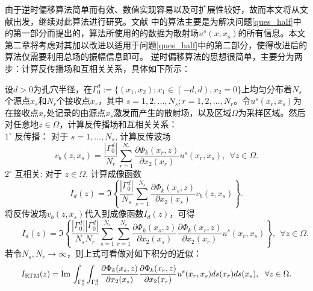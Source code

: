 由于逆时偏移算法简单而有效、数值实现容易以及可扩展性较好，故而本文将从文献\cite{ch_ha}出发，继续对此算法进行研究。文献
\cite{ch_ha}中的算法主要是为解决问题\ref{ques_half}中的第一部分而提出的，算法所使用的的数据为散射场$u^s(x,x_s)$的所有信息。本文第二章将考虑对其加以改进以适用于问题\ref{ques_half}中的第二部分，使得改进后的算法仅需要利用总场的振幅信息即可。
逆时偏移算法的思想很简单，主要分为两步：计算反传播场和互相关关系，具体如下所示：
\begin{algorithm}
设$d>0$为孔穴半径，在$\Gamma_0^d:=\{(x_1,x_2);x_1\in(-d,d),x_2=0\}$上均匀分布着$N_s$个源点$x_s$和$N_r$个接收点$x_r$，其中
$s=1,2,\ldots,N_s;r=1,2,\ldots,N_r$。令$u^s(x_r,x_s)$为在接收点$x_r$处记录的由源点$x_s$激发而产生的散射场，以及区域$\Omega$为采样区域。然后对任意地$z\in\Omega$，计算反传播场和互相关关系：\\
$1^\circ$ 反传播： 对于 $s=1,\ldots,N_s$, 计算反传波场
\begin{equation}
  v_b(z,x_s)=\frac{|\Gamma_0^d|}{N_r}\sum\limits_{r=1}^{N_r}\frac{\partial\Phi_k(x_r,z)}{\partial x_2(x_r)}u^s(x_r,x_s),\  \  \forall z\in\Omega.
\end{equation}
$2^\circ$ 互相关: 对于 $z\in\Omega$, 计算成像函数
\begin{equation}
  I_d(z)=\Im\left\{\frac{|\Gamma_0^d|}{N_s}\sum\limits_{s=1}^{N_s}\frac{\partial\Phi_k(x_s,z)}{\partial x_2(x_s)}v_b(z,x_s)
  \right\}.
\end{equation}
将反传波场$v_b(z,x_s)$代入到成像函数$I_d(z)$，可得
\begin{equation}
  \qquad I_d(z)=\Im\left\{\frac{|\Gamma_0^d||\Gamma_0^d|}{N_sN_r}
  \sum\limits_{s=1}^{N_s}\sum\limits_{r=1}^{N_r}
  \frac{\partial\Phi_k(x_s,z)}{\partial x_2(x_s)}\frac{\partial\Phi_k(x_r,z)}{\partial x_2(x_r)}
  u^s(x_r,x_s)
  \right\},\  \ \forall z\in\Omega.\quad\quad
\end{equation}
若令$N_s,N_r\rightarrow\infty$，则上式可看做对如下积分的近似：
\begin{equation}
 \qquad  I_{\rm RTM}(z)=\Im\int_{\Gamma_0^d}\int_{\Gamma_0^d}\frac{\partial\Phi_k(x_s,z)}{\partial x_2(x_s)}\frac{\partial\Phi_k(x_r,z)}{\partial x_2(x_r)}
  u^s(x_r,x_s)ds(x_r)ds(x_s),\  \  \forall z\in\Omega.\quad\quad
\end{equation}
\end{algorithm}

